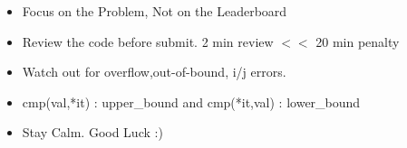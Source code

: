 \begin{itemize}\itemsep0pt
    \item Focus on the Problem, Not on the Leaderboard
    \item Review the code before submit. 2 min review $<<$ 20 min penalty
    \item Watch out for overflow,out-of-bound, i/j errors.
    \item cmp(val,*it) : upper\_bound and cmp(*it,val) : lower\_bound
    \item Stay Calm. Good Luck :)
  \end{itemize}
